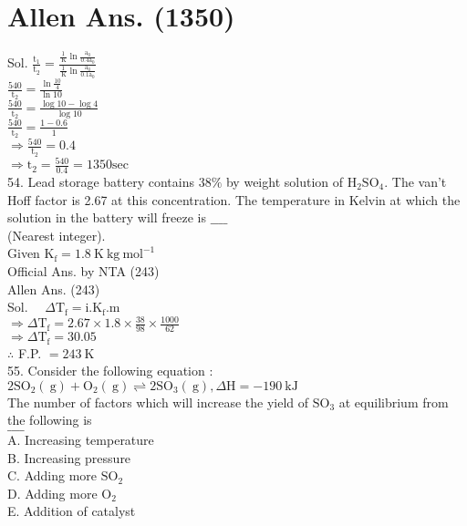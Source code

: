 \documentclass[10pt]{article}
\begin{document}
\section*{Allen Ans. (1350)}
Sol. \(\frac{\mathrm{t}_{1}}{\mathrm{t}_{2}}=\frac{\frac{1}{\mathrm{~K}} \ln \frac{\mathrm{a}_{0}}{0.4 \mathrm{a}_{0}}}{\frac{1}{\mathrm{~K}} \ln \frac{\mathrm{a}_{0}}{0.1 \mathrm{a}_{0}}}\)\\
\(\frac{540}{\mathrm{t}_{2}}=\frac{\ln \frac{10}{4}}{\ln 10}\)\\
\(\frac{540}{\mathrm{t}_{2}}=\frac{\log 10-\log 4}{\log 10}\)\\
\(\frac{540}{\mathrm{t}_{2}}=\frac{1-0.6}{1}\)\\
\(\Rightarrow \frac{540}{\mathrm{t}_{2}}=0.4\)\\
\(\Rightarrow \mathrm{t}_{2}=\frac{540}{0.4}=1350 \mathrm{sec}\)\\
54. Lead storage battery contains \(38 \%\) by weight solution of \(\mathrm{H}_{2} \mathrm{SO}_{4}\). The van't Hoff factor is 2.67 at this concentration. The temperature in Kelvin at which the solution in the battery will freeze is \(\_\_\_\_\)\\
(Nearest integer).\\
Given \(\mathrm{K}_{\mathrm{f}}=1.8 \mathrm{~K} \mathrm{~kg} \mathrm{~mol}^{-1}\)\\
Official Ans. by NTA (243)\\
Allen Ans. (243)\\
Sol. \(\quad \Delta \mathrm{T}_{\mathrm{f}}=\mathrm{i} . \mathrm{K}_{\mathrm{f}} . \mathrm{m}\)\\
\(\Rightarrow \Delta \mathrm{T}_{\mathrm{f}}=2.67 \times 1.8 \times \frac{38}{98} \times \frac{1000}{62}\)\\
\(\Rightarrow \Delta \mathrm{T}_{\mathrm{f}}=30.05\)\\
\(\therefore\) F.P. \(=243 \mathrm{~K}\)\\
55. Consider the following equation :\\
\(2 \mathrm{SO}_{2}(\mathrm{~g})+\mathrm{O}_{2}(\mathrm{~g}) \rightleftharpoons 2 \mathrm{SO}_{3}(\mathrm{~g}), \Delta \mathrm{H}=-190 \mathrm{~kJ}\)\\
The number of factors which will increase the yield of \(\mathrm{SO}_{3}\) at equilibrium from the following is\\
\(\_\_\_\_\)\\
A. Increasing temperature\\
B. Increasing pressure\\
C. Adding more \(\mathrm{SO}_{2}\)\\
D. Adding more \(\mathrm{O}_{2}\)\\
E. Addition of catalyst
\end{document}
